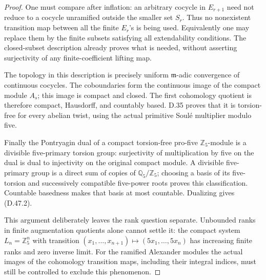 \begin{proof}
One must compare after inflation:
an arbitrary cocycle in \(E_{r+1}\)
need not reduce to a cocycle
unramified outside the smaller
set \(S_r\). Thus no nonexistent
transition map between all the
finite \(E_r\)'s is being used.
Equivalently one may replace them
by the finite subsets satisfying
all extendability conditions.
The closed-subset description
already proves what is needed,
without asserting surjectivity
of any finite-coefficient lifting
map.

The topology in this description
is precisely uniform
\(\mathfrak m\)-adic convergence
of continuous cocycles. The
coboundaries form the continuous
image of the compact module \(A_s\);
this image is compact and closed.
The first cohomology quotient
is therefore compact, Hausdorff,
and countably based. D.35 proves
that it is torsion-free for every
abelian twist, using the actual
primitive Soul\'e multiplier
modulo five.

Finally the Pontryagin dual of a
compact torsion-free pro-five
\(\mathbb Z_5\)-module is a divisible
five-primary torsion group:
surjectivity of multiplication
by five on the dual is dual to
injectivity on the original
compact module. A divisible
five-primary group is a direct
sum of copies of
\(\mathbb Q_5/\mathbb Z_5\);
choosing a basis of its five-torsion
and successively compatible
five-power roots proves this
classification. Countable
basedness makes that basis
at most countable. Dualizing
gives (D.47.2).

This argument deliberately leaves
the rank question separate.
Unbounded ranks in finite
augmentation quotients alone
cannot settle it: the compact
system \(L_n=\mathbb Z_5^n\)
with transition
\((x_1,\ldots,x_{n+1})
 \mapsto(5x_1,\ldots,5x_n)\)
has increasing finite ranks
and zero inverse limit.
For the ramified Alexander
modules the actual images of
the cohomology transition maps,
including their integral indices,
must still be controlled to
exclude this phenomenon.
\end{proof}

